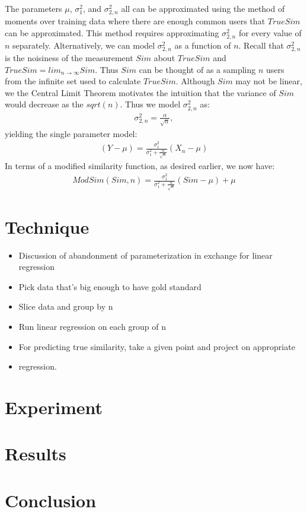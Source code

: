 \documentclass[11pt]{article}
\begin{document}
The parameters $\mu$, $\sigma_{1}^2$, and $\sigma_{2,n}^2$ all can be
approximated using the method of moments over training data where there are
enough common users that $TrueSim$ can be approximated. This method requires
approximating $\sigma_{2,n}^2$ for every value of $n$ separately. Alternatively,
we can model $\sigma_{2,n}^2$ as a function of $n$. Recall that $\sigma_{2,n}^2$
is the noisiness of the measurement $Sim$ about $TrueSim$ and $TrueSim = lim_{n
\to \infty}Sim$. Thus $Sim$ can be thought of as a sampling $n$ users from the
infinite set used to calculate $TrueSim$. Although $Sim$ may not be linear, we
the Central Limit Theorem motivates the intuition that the variance of $Sim$
would decrease as the $sqrt(n)$. Thus we model $\sigma_{2,n}^2$ as:
\begin{align}
\sigma_{2,n}^2 = \frac{\alpha}{\sqrt{n}},
\end{align}
yielding the single parameter model:
\begin{align}
\left(Y - \mu\right) = \frac{\sigma_{1}^2}{\sigma_{1}^2+\frac{\alpha}{\sqrt{n}}}
\left(X_n-\mu\right)
\end{align}
In terms of a modified similarity function, as desired earlier, we now have:
\begin{align}
ModSim(Sim, n) = \frac{\sigma_{1}^2}{\sigma_{1}^2+\frac{\alpha}{\sqrt{n}}}
\left(Sim-\mu\right) + \mu
\end{align}

\section*{Technique}

\begin{itemize}
    \item Discussion of abandonment of parameterization in exchange for linear regression
    \item Pick data that's big enough to have gold standard
    \item Slice data and group by n
    \item Run linear regression on each group of n
    \item For predicting true similarity, take a given point and project on appropriate
    \item regression.
\end{itemize}


\section*{Experiment}

\section*{Results}

\section*{Conclusion}
\end{document}
